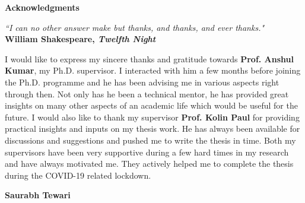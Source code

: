 

{}
\begin{center}
	{\Huge \textbf{Acknowledgments}} 
\end{center}

\begin{flushright}
{\em``{I can no other answer make but thanks, and thanks, and ever thanks.}"} \\ 
	\vspace{0.20cm}
\textemdash  \bf William Shakespeare, \em Twelfth Night
\end{flushright}

\vspace{0.30cm}

I would like to express my sincere thanks and gratitude towards \textbf{Prof. Anshul Kumar}, my Ph.D. supervisor. I interacted with him a few months before joining the Ph.D. programme and he has been advising me in various aspects right through then. Not only has he been a technical mentor, he has provided great insights on many other aspects of an academic life which would be useful for the future. I would also like to thank my supervisor \textbf{Prof. Kolin Paul} for providing practical insights and inputs on my thesis work. He has always been available for discussions and suggestions and pushed me to write the thesis in time. Both my supervisors have been very supportive during a few hard times in my research and have always motivated me. They actively helped me to complete the thesis during the COVID-19 related lockdown.


\vspace{0.9cm}
{ \begin{flushright}{\bf Saurabh Tewari}\end{flushright} }